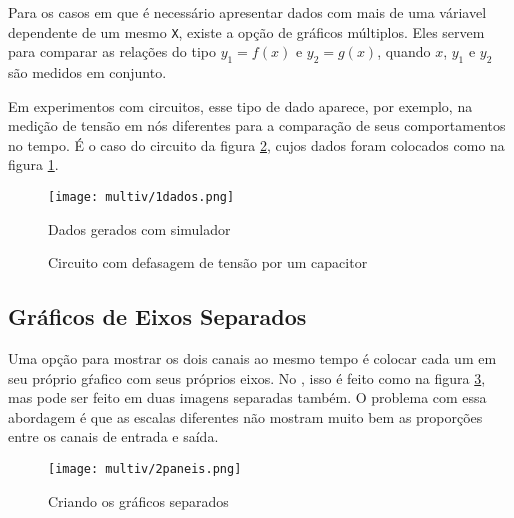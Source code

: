\edef\indentacao{\the\parindent}

\noindent
\begin{minipage}[t]{0.55\textwidth}\setlength{\parindent}{\indentacao}

    Para os casos em que é necessário apresentar dados com mais de uma váriavel dependente de um mesmo \texttt{X}, existe a opção de gráficos múltiplos. Eles servem para comparar as relações do tipo $y_1 = f(x)$ e $y_2 = g(x)$, quando $x$, $y_1$ e $y_2$ são medidos em conjunto.

    Em experimentos com circuitos, esse tipo de dado aparece, por exemplo, na medição de tensão em nós diferentes para a comparação de seus comportamentos no tempo. É o caso do circuito da figura \ref{fig:multiv:circuito}, cujos dados foram colocados como na figura \ref{fig:multiv:dados}.

    \begin{figure}[H]
        \centering
        \texttt{[image: multiv/1dados.png]}

        \caption{Dados gerados com simulador}
        \label{fig:multiv:dados}
    \end{figure}

\end{minipage}\vspace{0.05\textwidth}%
\begin{minipage}[t]{0.4\textwidth}
    \begin{figure}[H]
        \centering
        

        \caption{Circuito com defasagem de tensão por um capacitor}
        \label{fig:multiv:circuito}
    \end{figure}
\end{minipage}


\subsection{Gráficos de Eixos Separados}

    Uma opção para mostrar os dois canais ao mesmo tempo é colocar cada um em seu próprio gŕafico com seus próprios eixos. No \software, isso é feito como na figura \ref{fig:multiv:paneis:tutorial}, mas pode ser feito em duas imagens separadas também. O problema com essa abordagem é que as escalas diferentes não mostram muito bem as proporções entre os canais de entrada e saída.

    \begin{figure}[H]
        \centering
        \texttt{[image: multiv/2paneis.png]}

        \caption{Criando os gráficos separados}
        \label{fig:multiv:paneis:tutorial}
    \end{figure}

